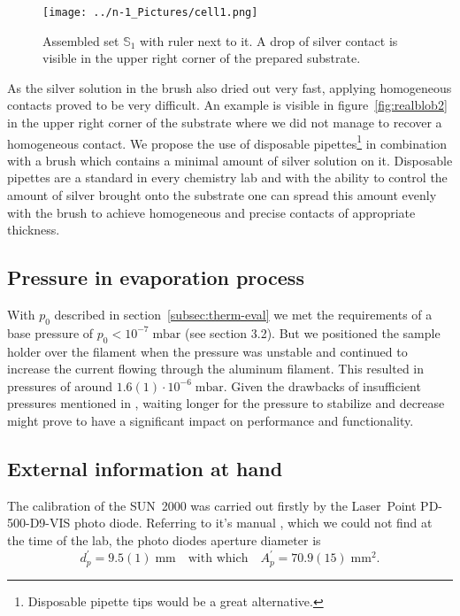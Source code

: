 \begin{figure}[h]\centering
\texttt{[image: ../n-1\_Pictures/cell1.png]}
\caption{Assembled set $\mathbb{S}_1$ with ruler next to it. A drop of silver contact is visible in the upper right corner of the prepared substrate.}
\label{fig:realblob3}
\end{figure}

As the silver solution in the brush also dried out very fast, applying homogeneous contacts proved to be very difficult. An example is visible in figure~\ref{fig:realblob2} in the upper right corner of the substrate where we did not manage to recover a homogeneous contact.\mypar
We propose the use of disposable pipettes\footnote{Disposable pipette tips would be a great alternative.} in combination with a brush which contains a minimal amount of silver solution on it. Disposable pipettes are a standard in every chemistry lab and with the ability to control the amount of silver brought onto the substrate one can spread this amount evenly with the brush to achieve homogeneous and precise contacts of appropriate thickness.

\subsection{Pressure in evaporation process}

With $p_0$ described in section~\ref{subsec:therm-eval} we met the requirements of a base pressure of $p_0<10^{-7}\;\text{mbar}$ (see \cite{labdesc} section 3.2). But we positioned the sample holder over the filament when the pressure was unstable and continued to increase the current flowing through the aluminum filament. This resulted in pressures of around $1.6(1)\cdot10^{-6}\;\text{mbar}$.\mypar
Given the drawbacks of insufficient pressures mentioned in \cite{labdesc}, waiting longer for the pressure to stabilize and decrease might prove to have a significant impact on performance and functionality.

\subsection{External information at hand}

The calibration of the SUN~2000 was carried out firstly by the Laser~Point PD-500-D9-VIS photo diode. Referring to it's manual \cite{reracat}, which we could not find at the time of the lab, the photo diodes aperture diameter is
\begin{equation*}
d^\prime_p = 9.5(1)\;\text{mm}\quad\text{with which}\quad A^\prime_p = 70.9(15)\;\text{mm}^2.
\end{equation*}

